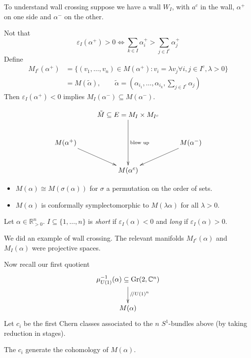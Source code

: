 To understand wall crossing suppose we have
a wall $W_I$, with $a^c$ in the wall,
$\alpha^+$ on one side and $\alpha^-$ on the other.

Not that
$$
\varepsilon_I(\alpha^+)>0 \iff
\sum_{k \in I}\alpha_i^+> 
\sum_{ j \in I^c}\alpha_j^+
$$
Define
\begin{align*}
M_{I^c}(\alpha^+)
&=\{(v_1,\ldots,v_n) \in M(\alpha^+):
v_i=\lambda v_j \forall i,j \in I^c, \lambda>0\}\\
&=M(\tilde{\alpha}),\qquad \tilde{\alpha}=
\left(\alpha_{i_1},\ldots,\alpha_{i_k},\sum_{j \in I^c}\alpha_j\right)
\end{align*}
Then $\varepsilon_I(\alpha^+)<0$ 
implies $M_I(\alpha^-) \subseteq M(\alpha^-)$.

$$
\xymatrix{
&\tilde{M} \subseteq E=M_I \times M_{I^c}\ar[dd]^{\text{blow up}}\\
M(\alpha^+)\ar[dr]&  &  M(\alpha^-)\ar[dl]\\
&M(\alpha^c)
}
$$
\begin{remark}
\label{remark-moduli-spaces-of-polygons-proportional}
\begin{itemize}
\item $M(\alpha)\cong M(\sigma(\alpha))$
for $\sigma$ a permutation on the order of sets.
\item $M(\alpha)$ is conformally symplectomorphic
to $M(\lambda \alpha)$ for all $\lambda>0$.
\end{itemize}
\end{remark}

\begin{definition}
\label{definition-short-and-long}
Let $\alpha \in \mathbb{R}^n_{>0}$.
$I \subseteq \{1,\ldots,n\}$ is {\it short} 
if $\varepsilon_I(\alpha)<0$ and {\it long}
if  $\varepsilon_I(\alpha)>0$.
\end{definition}

\begin{example}
\label{example-wall-crossing}
We did an example of wall crossing.
The relevant manifolds $M_{I^c}(\alpha)$ and $M_I(\alpha)$ 
were projective spaces.
\end{example}

\medskip\noindent
Now recall our first quotient
$$
\xymatrix{
\mu_{U(1)}^{-1}(\alpha)\subseteq \text{Gr}(2,\mathbb{C}^n)
\ar[d]^{/\!/U(1)^n}\\
M(\alpha)
}
$$
Let $c_i$ be the first Chern
classes associated to the
$n$ $S^1$-bundles above
(by taking reduction in stages).

\begin{theorem}
\label{theorem-Haussmann-Knutson-M}
The $c_i$ generate the cohomology of $M(\alpha)$.
\end{theorem}

